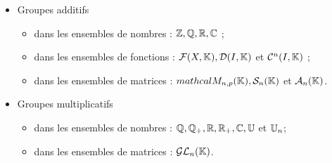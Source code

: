 \begin{defprop}
    \begin{itemize}
        \item Groupes additifs
        \begin{itemize}
            \item dans les ensembles de nombres : \(\mathbb{Z}, \mathbb{Q}, \mathbb{R}, \mathbb{C}\) ;
            \item dans les ensembles de fonctions : \(\mathcal{F}(X, \mathbb{K}), \mathcal{D} (I, \mathbb{K})\) et \(\mathcal{C}^n (I, \mathbb{K})\) ;
            \item dans les ensembles de matrices : \(mathcal{M}_{n,p} (\mathbb{K}), \mathcal{S}_n (\mathbb{K})\) et \(\mathcal{A}_n (\mathbb{K})\).
        \end{itemize}
        \item Groupes multiplicatifs
        \begin{itemize}
            \item dans les ensembles de nombres : \(\mathbb{Q}, \mathbb{Q}_+, \mathbb{R}, \mathbb{R}_+, \mathbb{C}, \mathbb{U}\) et \(\mathbb{U}_n\);
            \item dans les ensembles de matrices : \(\mathcal{GL}_n (\mathbb{K})\).
        \end{itemize}
    \end{itemize}
\end{defprop}

